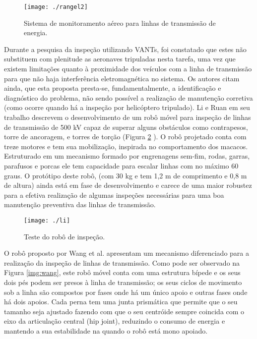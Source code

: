 \begin{figure} [h!]	
	\caption{Sistema de monitoramento aéreo para linhas de transmissão de energia.}
	\label{img:rangel2}											 
	\centering													 
	\texttt{[image: ./rangel2]}
\end{figure}													 

Durante a pesquisa da inspeção utilizando VANTs, foi constatado que estes não substituem com plenitude as aeronaves tripuladas nesta tarefa, uma vez que existem limitações quanto à proximidade dos veículos com a linha de transmissão para que não haja interferência eletromagnética no sistema. Os autores citam ainda, que esta proposta presta-se, fundamentalmente, a identificação e diagnóstico do problema, não sendo possível a realização de manutenção corretiva (como ocorre quando há a inspeção por helicóptero tripulado).  
Li e Ruan \cite{li2010autonomous} em seu trabalho descrevem o desenvolvimento de um robô móvel para inspeção de linhas de transmissão de 500 kV capaz de superar alguns obstáculos como contrapesos, torre de ancoragem, e torres de torção (Figura \ref{img:li} ). O robô projetado conta com treze motores e tem sua mobilização, inspirada no comportamento dos macacos. Estruturado em um mecanismo formado por engrenagens sem-fim, rodas, garras, parafusos e porcas ele tem capacidade para escalar linhas com no máximo 60 graus. O protótipo deste robô, (com 30 kg e tem 1,2 m de comprimento e 0,8 m de altura) ainda está em fase de desenvolvimento e carece de uma maior robustez para a efetiva realização de algumas inspeções necessárias para uma boa manutenção preventiva das linhas de transmissão.

\begin{figure} [h!]	
	\caption{Teste do robô de inspeção.}
	\label{img:li}											 
	\centering													 
	\texttt{[image: ./li]}
\end{figure}													 

O robô proposto por Wang et al. \cite{wang2010design} apresentam um mecanismo diferenciado para a realização da inspeção de linhas de transmissão. Como pode ser observado na Figura \ref{img:wang}, este robô móvel conta com uma estrutura bípede e os seus dois pés podem ser presos à linha de transmissão; os seus ciclos de movimento sob a linha são compostos por fases onde há um único apoio e outras fases onde há dois apoios. Cada perna tem uma junta prismática que permite que o seu tamanho seja ajustado fazendo com que o seu centróide sempre coincida com o eixo da articulação central (hip joint), reduzindo o consumo de energia e mantendo a sua estabilidade na quando o robô está mono apoiado. 

